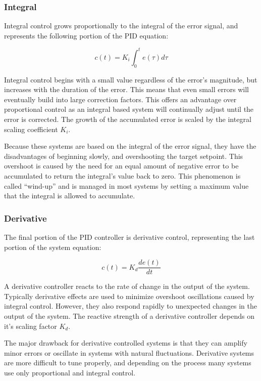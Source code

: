 \documentclass[11pt,fleqn]{book} %
\begin{document}
\subsubsection{Integral}
Integral control grows proportionally to the integral of the error signal, and represents the following portion of the PID equation:

\begin{equation*}
c(t) = K_{i}\int_{0}^{t}e(\tau)d\tau
\end{equation*} 

Integral control begins with a small value regardless of the error's magnitude, but increases with the duration of the error. This means that even small errors will eventually build into large correction factors. This offers an advantage over proportional control as an integral based system will continually adjust until the error is corrected. The growth of the accumulated error is scaled by the integral scaling coefficient $ K_{i}$.

Because these systems are based on the integral of the error signal, they have the disadvantages of beginning slowly, and overshooting the target setpoint. This overshoot is caused by the need for an equal amount of negative error to be accumulated to return the integral's value back to zero. This phenomenon is called ``wind-up'' and is managed in most systems by setting a maximum value that the integral is allowed to accumulate. 

\subsubsection{Derivative}
The final portion of the PID controller is derivative control, representing the last portion of the system equation:

\begin{equation*}
c(t) = K_{d}\frac{de(t)}{dt}
\end{equation*} 

A derivative controller reacts to the rate of change in the output of the system. Typically derivative effects are used to minimize overshoot oscillations caused by integral control. However, they also respond rapidly to unexpected changes in the output of the system. The reactive strength of a derivative controller depends on it's scaling factor $K_{d}$.

The major drawback for derivative controlled systems is that they can amplify minor errors or oscillate in systems with natural fluctuations. Derivative systems are more difficult to tune properly, and depending on the process many systems use only proportional and integral control. 
\end{document}
